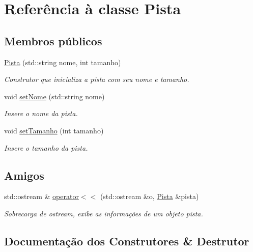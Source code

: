 \hypertarget{classPista}{}\section{Referência à classe Pista}
\label{classPista}
\subsection*{Membros públicos}
\begin{DoxyCompactItemize}
\item 
\hyperlink{classPista_a037a3c407c56d95fa98c6e0525de28cc}{Pista} (std\+::string nome, int tamanho)
\begin{DoxyCompactList}\small\item\em Construtor que inicializa a pista com seu nome e tamanho. \end{DoxyCompactList}\item 
void \hyperlink{classPista_ad0c553cfa88f083810eb6259e328df7b}{set\+Nome} (std\+::string nome)
\begin{DoxyCompactList}\small\item\em Insere o nome da pista. \end{DoxyCompactList}\item 
void \hyperlink{classPista_a08d26ad19e300462d05208e6e15b56e7}{set\+Tamanho} (int tamanho)
\begin{DoxyCompactList}\small\item\em Insere o tamanho da pista. \end{DoxyCompactList}\end{DoxyCompactItemize}
\subsection*{Amigos}
\begin{DoxyCompactItemize}
\item 
std\+::ostream \& \hyperlink{classPista_a22c7e3e6f6a5da426ab7e401e3567185}{operator$<$$<$} (std\+::ostream \&o, \hyperlink{classPista}{Pista} \&pista)
\begin{DoxyCompactList}\small\item\em Sobrecarga de ostream, exibe as informações de um objeto pista. \end{DoxyCompactList}\end{DoxyCompactItemize}


\subsection{Documentação dos Construtores \& Destrutor}
\mbox{\label{classPista_a037a3c407c56d95fa98c6e0525de28cc}} 
